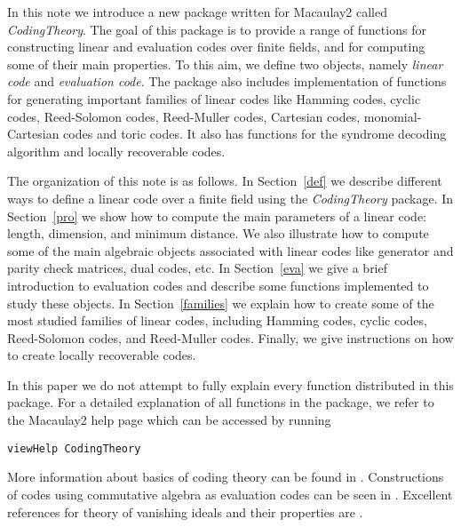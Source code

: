 \documentclass[12pt]{amsart}
\theoremstyle{plain}
\begin{document}
In this note we introduce a new package written for Macaulay2 \cite{M2} called \textit{CodingTheory}. The goal of this package is to provide a range of functions for constructing  linear and evaluation codes over finite fields, and for computing some of their main properties. To this aim, we define two objects, namely \textit{linear code} and \textit{evaluation code}. The package also includes implementation of functions for generating important families of linear codes like Hamming codes, cyclic codes, Reed-Solomon codes, Reed-Muller codes, Cartesian codes, monomial-Cartesian codes and toric codes. It also has functions for the syndrome decoding algorithm and locally recoverable codes. 

The organization of this note is as follows. In Section~\ref{def} we describe different ways to define a linear code over a finite field using the \textit{CodingTheory} package. In Section~\ref{pro} we show how to compute the main parameters of a linear code: length, dimension, and minimum distance. We also illustrate how to compute some of the main algebraic objects associated with linear codes like generator and parity check matrices, dual codes, etc. In Section~\ref{eva} we give a brief introduction to evaluation codes and describe some functions implemented to study these objects. In Section~\ref{families} we explain how to create some of the most studied families of linear codes, including Hamming codes, cyclic codes, Reed-Solomon codes, and Reed-Muller codes. Finally, we give instructions on how to create locally recoverable codes.

In this paper we do not attempt to fully explain every function distributed in this package.
For a detailed explanation of all functions in the package, we refer to the Macaulay2 help page which can be accessed by
running 
\begin{verbatim}
viewHelp CodingTheory
\end{verbatim}

More information about basics of coding theory can be found in \cite{huf-pless,MacWilliams-Sloane,van-lint}. Constructions of codes using commutative algebra as evaluation codes can be seen in
\cite{carvalho4,GLS,Ha1,LSc,MPV,MPV2,algcodes,renteria-tapia-ca2, Ru, SoSo, So1}. Excellent references for theory of vanishing ideals and their properties are \cite{CLO,monalg}.
\end{document}
